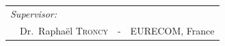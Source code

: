 {\begin{titlepage}


\begin{center}
\noindent \large
\begin{tabular}{llcl}


\\
      \textit{Supervisor:}& 		& & \\
       \multicolumn{2}{l}{~~Dr.\ Rapha\"el \textsc{Troncy}} 		& - & EURECOM, France \\

\end{tabular}
\end{center}

\end{titlepage}

}
